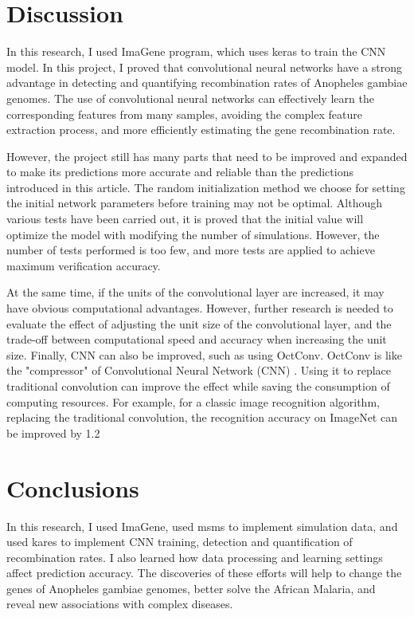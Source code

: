 \documentclass[11pt,a4 paper,title page]{article}
\begin{document}
  \section{Discussion}
In this research, I used ImaGene program, which uses keras to train the CNN model. In this project, I proved that convolutional neural networks have a strong advantage in detecting and quantifying recombination rates of Anopheles gambiae genomes. The use of convolutional neural networks can effectively learn the corresponding features from many samples, avoiding the complex feature extraction process, and more efficiently estimating the gene recombination rate.
\hfill\break  

However, the project still has many parts that need to be improved and expanded to make its predictions more accurate and reliable than the predictions introduced in this article. The random initialization method we choose for setting the initial network parameters before training may not be optimal. Although various tests have been carried out, it is proved that the initial value will optimize the model with modifying the number of simulations. However, the number of tests performed is too few, and more tests are applied to achieve maximum verification accuracy.
\hfill\break  

At the same time, if the units of the convolutional layer are increased, it may have obvious computational advantages. However, further research is needed to evaluate the effect of adjusting the unit size of the convolutional layer, and the trade-off between computational speed and accuracy when increasing the unit size. 
\hfill\break  
Finally, CNN can also be improved, such as using OctConv. OctConv is like the "compressor" of Convolutional Neural Network (CNN) \cite{ chen2019drop}. Using it to replace traditional convolution can improve the effect while saving the consumption of computing resources. For example, for a classic image recognition algorithm, replacing the traditional convolution, the recognition accuracy on ImageNet can be improved by 1.2%
\hfill\break  
  \section{Conclusions}
In this research, I used ImaGene, used msms to implement simulation data, and used kares to implement CNN training, detection and quantification of recombination rates. I also learned how data processing and learning settings affect prediction accuracy. 
The discoveries of these efforts will help to change the genes of Anopheles gambiae genomes, better solve the African Malaria, and reveal new associations with complex diseases.
  
  
\end{document}
